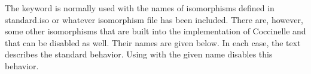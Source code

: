 \begin{grammar}








\end{grammar}

The keyword  is normally used with the names of
isomorphisms defined in standard.iso or whatever isomorphism file has been
included.  There are, however, some other isomorphisms that are built into
the implementation of Coccinelle and that can be disabled as well.  Their
names are given below.  In each case, the text describes the standard
behavior.  Using  with the given name disables this behavior.

